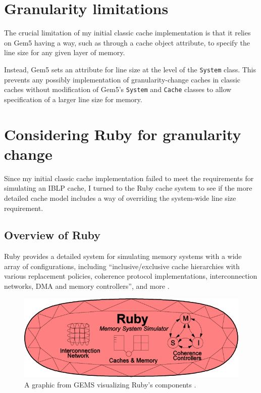 \documentclass[12pt,twoside]{reedthesis}
\begin{document}
\section{Granularity limitations}

	The crucial limitation of my initial classic cache implementation is that it relies on Gem5 having a way, such as through a cache object attribute, to specify the line size for any given layer of memory.

	Instead, Gem5 sets an attribute for line size at the level of the \verb`System` class. This prevents any possibly implementation of granularity-change caches in classic caches without modification of Gem5's \verb`System` and \verb`Cache` classes to allow specification of a larger line size for memory.


\section{Considering Ruby for granularity change}

	Since my initial classic cache implementation failed to meet the requirements for simulating an IBLP cache, I turned to the Ruby cache system to see if the more detailed cache model includes a way of overriding the system-wide line size requirement.

	\subsection*{Overview of Ruby}

	Ruby provides a detailed system for simulating memory systems with a wide array of configurations, including ``inclusive/exclusive cache hierarchies with various replacement policies, coherence protocol implementations, interconnection networks, DMA and memory controllers'', and more \cite{gem5-ruby}.

	\begin{figure}[h]
		\centering
		\includegraphics[width=4.5in]{figures/ruby.jpg}
		\caption{A graphic from GEMS visualizing Ruby's components \cite{gem5-ruby}.}
	\end{figure}
\end{document}
